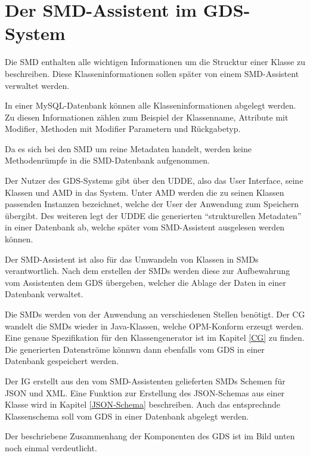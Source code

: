 \section{Der SMD-Assistent im GDS-System}
Die \ac{SMD} enthalten alle wichtigen Informationen um die Strucktur einer Klasse zu beschreiben. Diese Klasseninformationen sollen sp\"ater von einem SMD-Assistent verwaltet werden.

In einer MySQL-Datenbank k\"onnen alle Klasseninformationen abgelegt werden. Zu diesen Informationen z\"ahlen zum Beispiel der Klassenname, Attribute mit Modifier, Methoden mit Modifier Parametern und R\"uckgabetyp. 

Da es sich bei den \ac{SMD} um reine Metadaten handelt, werden keine Methodenr\"umpfe in die \ac{SMD}-Datenbank aufgenommen.

Der Nutzer des \ac{GDS}-Systems gibt \"uber den \ac{UDDE}, also das User Interface, seine Klassen und \ac{AMD} in das System.
Unter \ac{AMD} werden die zu seinen Klassen passenden Instanzen bezeichnet, welche der User der Anwendung zum Speichern \"ubergibt.
Des weiteren legt der \ac{UDDE} die generierten "`strukturellen Metadaten"' in einer Datenbank ab, welche sp\"ater vom SMD-Assistent ausgelesen werden k\"onnen.

Der SMD-Assistent ist also f\"ur das Umwandeln von Klassen in \ac{SMD}s verantwortlich. Nach dem erstellen der \ac{SMD}s werden diese zur Aufbewahrung vom Assistenten dem \ac{GDS} \"ubergeben, welcher die Ablage der Daten in einer Datenbank verwaltet.

Die \ac{SMD}s werden von der Anwendung an verschiedenen Stellen ben\"otigt. Der \ac{CG} wandelt die \ac{SMD}s wieder in Java-Klassen, welche OPM-Konform erzeugt werden. Eine genaue Spezifikation f\"ur den Klassengenerator ist im Kapitel \ref{CG} zu finden.
Die generierten Datenstr\"ome k\"onnwn dann ebenfalls vom \ac{GDS} in einer Datenbank gespeichert werden.

Der \ac{IG} erstellt aus den vom SMD-Assistenten gelieferten \ac{SMD}s Schemen f\"ur JSON und XML. Eine Funktion zur Erstellung des JSON-Schemas aus einer Klasse wird in Kapitel \ref{JSON-Schema} beschreiben.
Auch das entsprechnde Klassenschema soll vom \ac{GDS} in einer Datenbank abgelegt werden.

Der beschriebene Zusammenhang der Komponenten des \ac{GDS} ist im Bild unten noch einmal verdeutlicht.

